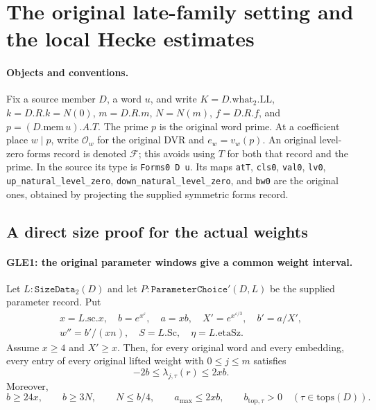 \section{The original late-family setting and the local Hecke estimates}
\label{sec:global-local-estimates}


\paragraph{Objects and conventions.}
Fix a source member $D$, a word $u$, and write
$K=D.\mathrm{what}_2.\mathrm{LL}$, $k=D.R.k=N(0)$,
$m=D.R.m$, $N=N(m)$, $f=D.R.f$, and $p=(D.\mathrm{mem}\,u).A.T$.
The prime $p$ is the original word prime.  At a coefficient place $w\mid p$,
write $\mathcal O_w$ for the original DVR and $e_w=v_w(p)$.
An original level-zero forms record is denoted $\mathcal F$; this avoids
using $T$ for both that record and the prime.  In the source its type is
\texttt{Forms0 D u}.  Its maps \texttt{atT}, \texttt{cls0}, \texttt{val0},
\texttt{lv0}, \texttt{up\_natural\_level\_zero},
\texttt{down\_natural\_level\_zero}, and \texttt{bw0} are the original
ones, obtained by projecting the supplied symmetric forms record.

\subsection{A direct size proof for the actual weights}

\paragraph{GLE1: the original parameter windows give a common weight interval.}
\label{claim:GLE1}
Let $L:\texttt{SizeData}_2(D)$ and let $P:\texttt{ParameterChoice}'(D,L)$
be the supplied parameter record.  Put
\[
 \begin{gathered}
 x=L.\mathrm{sc}.x,\quad b=e^{x^\varepsilon},\quad a=xb,
 \quad X'=e^{x^{\varepsilon/3}},\quad b'=a/X',\\
 w''=b'/(xn),\quad S=L.\mathrm{Sc},\quad \eta=L.\mathrm{etaSz}.
 \end{gathered}
 \tag{GLE.1}
\]
Assume $x\ge4$ and $X'\ge x$.  Then, for every original word and every
embedding, every entry of every original lifted weight with $0\le j\le m$
satisfies
\[
 -2b\le\lambda_{j,\tau}(r)\le2xb.                 \tag{GLE.2}
\]
Moreover,
\[
 b\ge24x,\qquad b\ge3N,\qquad N\le b/4,
 \qquad a_{\max}\le2xb,
 \qquad b_{\mathrm{top},\tau}>0\quad(\tau\in\mathrm{tops}(D)).
 \tag{GLE.3}
\]

